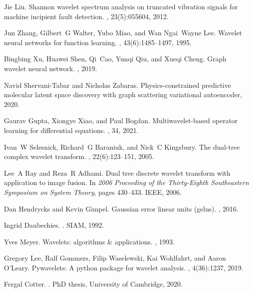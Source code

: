 \documentclass{article}
\begin{document}
\begin{thebibliography}{10}
Jie Liu.
\newblock Shannon wavelet spectrum analysis on truncated vibration signals for
  machine incipient fault detection.
, 23(5):055604, 2012.

Jun Zhang, Gilbert~G Walter, Yubo Miao, and Wan Ngai~Wayne Lee.
\newblock Wavelet neural networks for function learning.
, 43(6):1485--1497, 1995.

Bingbing Xu, Huawei Shen, Qi~Cao, Yunqi Qiu, and Xueqi Cheng.
\newblock Graph wavelet neural network.
, 2019.

Navid Shervani-Tabar and Nicholas Zabaras.
\newblock Physics-constrained predictive molecular latent space discovery with
  graph scattering variational autoencoder, 2020.

Gaurav Gupta, Xiongye Xiao, and Paul Bogdan.
\newblock Multiwavelet-based operator learning for differential equations.
, 34, 2021.

Ivan~W Selesnick, Richard~G Baraniuk, and Nick~C Kingsbury.
\newblock The dual-tree complex wavelet transform.
, 22(6):123--151, 2005.

Lee~A Ray and Reza~R Adhami.
\newblock Dual tree discrete wavelet transform with application to image
  fusion.
\newblock In {\em 2006 Proceeding of the Thirty-Eighth Southeastern Symposium
  on System Theory}, pages 430--433. IEEE, 2006.

Dan Hendrycks and Kevin Gimpel.
\newblock Gaussian error linear units (gelus).
, 2016.

Ingrid Daubechies.
.
\newblock SIAM, 1992.

Yves Meyer.
\newblock Wavelets: algorithms \& applications.
, 1993.

Gregory Lee, Ralf Gommers, Filip Waselewski, Kai Wohlfahrt, and Aaron O'Leary.
\newblock Pywavelets: A python package for wavelet analysis.
, 4(36):1237, 2019.

Fergal Cotter.
.
\newblock PhD thesis, University of Cambridge, 2020.

\end{thebibliography}
  
\end{document}

